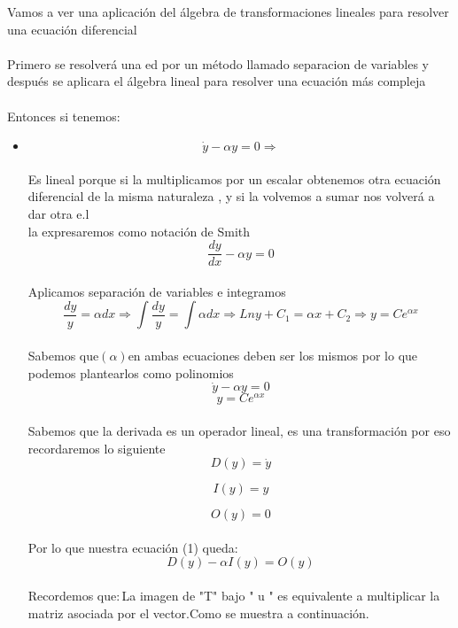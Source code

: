 \documentclass[10pt,a4paper]{article}
\begin{document}
{{{{{{{{{{{{  Vamos a ver una aplicación del álgebra de transformaciones lineales para resolver una ecuación diferencial\\\,\\
 Primero se resolverá una ed por un método llamado separacion de variables y después se aplicara el álgebra lineal para resolver una ecuación más compleja\\\,\\
 Entonces si tenemos: 
 \begin{itemize}
 \item  
 \begin{equation}\tag{Ecuación diferencial lineal ordinaria homogenea de coeficientes constantes}
\dot{y}-\alpha y=0\Rightarrow 
\end{equation}\\Es lineal porque  si la multiplicamos por un escalar obtenemos otra ecuación diferencial de la misma naturaleza , y si la volvemos a sumar nos volverá a dar otra e.l\\

la expresaremos como notación de Smith\\
$$\dfrac{dy}{dx}-\alpha y=0$$
\\
Aplicamos separación de variables e integramos
$$\dfrac{dy}{y}=\alpha dx \Rightarrow \int \dfrac{dy}{y} =\int \alpha dx \Rightarrow Lny+C_1=\alpha x+C_2\Rightarrow y= Ce^{\alpha x}$$\\
Sabemos que$ (\alpha ) $en ambas ecuaciones deben ser los mismos por lo que podemos plantearlos como polinomios\\
\begin{equation}\tag{1}
\dot{y}-\alpha y=0
\end{equation}
\begin{equation}\tag{2}
y= Ce^{\alpha x}
\end{equation}
\\
Sabemos que la derivada es un operador lineal, es una transformación por eso recordaremos lo siguiente\\

\begin{equation}\tag{La imagen de "y" bajo la derivada es igual a "y" prima}
D(y)=\dot{y}
\end{equation}

\begin{equation}\tag{La imagen de "y" bajo trasformación identidad es la misma funcion "y" }
I(y)=y
\end{equation}

\begin{equation}\tag{La trasformacion nula al trasformar a "y" me devuelva a cero}
O(y)=0
\end{equation}\\
Por lo que nuestra ecuación (1) queda:
\begin{equation}\tag{3}
D(y)-\alpha I(y)=O(y)
\end{equation}\\
Recordemos que:\,La imagen de "T" bajo " u " es equivalente a multiplicar la matriz asociada por el vector.Como se muestra a continuación.


\end{itemize}}}}}}}}}}}}}
\end{document}
